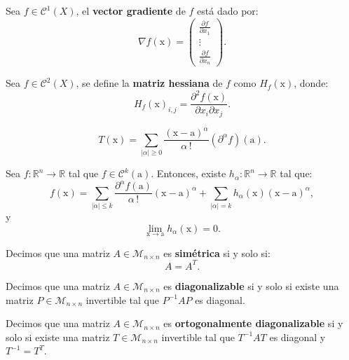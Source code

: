 \documentclass[8pt,a4paper]{extarticle}
\begin{document}
\begin{multicols}{3}
	\begin{boxdef}
		Sea $f \in \mathcal{C}^1 (X)$, el \textbf{vector gradiente} de $f$ está dado por:
		\[
			\nabla f(\mathrm{x}) =
			\begin{pmatrix} \displaystyle \frac{\partial f}{\partial x_1} \\ \vdots \\ \displaystyle \frac{\partial f}{\partial x_n} \end{pmatrix}
			.\]
	\end{boxdef}

	\begin{boxdef}
		Sea $f \in \mathcal{C}^2 (X)$, se define la \textbf{matriz hessiana} de $f$ como $H_f(\mathrm{x})$, donde:
		\[
			H_f (\mathrm{x})_{i,j} = \frac{\partial^2 f(\mathrm{x})}{\partial x_i \partial x_j}
			.\]
	\end{boxdef}

	\begin{boxdef}
		\[
			T(\mathrm{x}) = \sum_{|\alpha| \ge 0} \frac{(\mathrm{x} - \mathrm{a})^\alpha}{\alpha\,!} \left(\partial^\alpha f \right)(\mathrm{a})
			.\]
	\end{boxdef}

	\begin{boxtheo}[de Taylor]
		Sea $f : \mathbb{R}^n \to \mathbb{R}$ tal que $f \in \mathcal{C}^k(\mathrm{a})$. Entonces, existe $h_{\alpha} : \mathbb{R}^n \to \mathbb{R}$ tal que:
		\[
			f(\mathrm{x}) = \sum_{|\alpha| \le k} \frac{\partial^\alpha f(\mathrm{a})}{\alpha\,!} (\mathrm{x} - \mathrm{a})^\alpha + \sum_{|\alpha| = k} h_{\alpha}(\mathrm{x})(\mathrm{x} - \mathrm{a})^\alpha
			,\]
		y
		\[
			\lim_{\mathrm{x} \to \mathrm{a}} h_{\alpha} (\mathrm{x}) = 0
			.\]
	\end{boxtheo}

	\begin{boxdef}
		Decimos que una matriz $A \in \mathcal{M}_{n \times n}$ es \textbf{simétrica} si y solo si:
		\[
			A = A^T
			.\]
	\end{boxdef}

	\begin{boxdef}
		Decimos que una matriz $A \in \mathcal{M}_{n \times n}$ es \textbf{diagonalizable} si y solo si existe una matriz $P  \in \mathcal{M}_{n \times n}$ invertible tal que $P^{-1}AP$ es diagonal.
	\end{boxdef}

	\begin{boxdef}
		Decimos que una matriz $A \in \mathcal{M}_{n \times n}$ es \textbf{ortogonalmente diagonalizable} si y solo si existe una matriz $T  \in \mathcal{M}_{n \times n}$ invertible tal que $T^{-1}AT$ es diagonal y $T^{-1} = T^T$.
	\end{boxdef}


\end{multicols}
\end{document}

